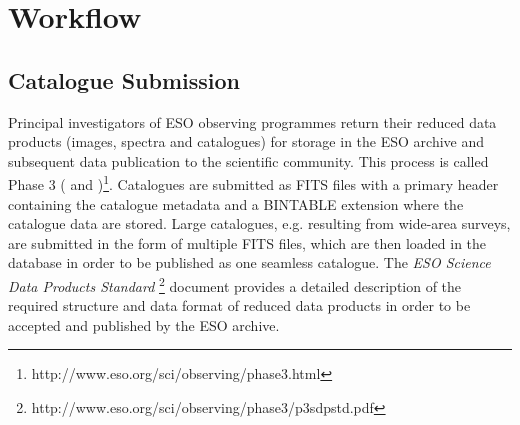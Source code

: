 \documentclass[11pt,twoside]{article}
\begin{document}
\section{Workflow}
\subsection{Catalogue Submission}
Principal investigators of ESO observing programmes return their reduced data products (images, spectra and catalogues) for storage in the ESO archive and subsequent data
publication to the scientific community. This process is called Phase 3 (\citet{phase3} and \citet{messenger})\footnote{http://www.eso.org/sci/observing/phase3.html}.
Catalogues are submitted as FITS files with a primary header containing the catalogue metadata and a BINTABLE extension where the catalogue data are stored. Large catalogues, e.g.
resulting from wide-area surveys, are submitted in the form of multiple FITS files, which are then loaded in the database in order to be published as one seamless catalogue.
The \textit{ESO Science Data Products Standard} \footnote{http://www.eso.org/sci/observing/phase3/p3sdpstd.pdf}
document provides a detailed description of the required structure and data format of reduced data products in order to be accepted and published
by the ESO archive.
\end{document}
